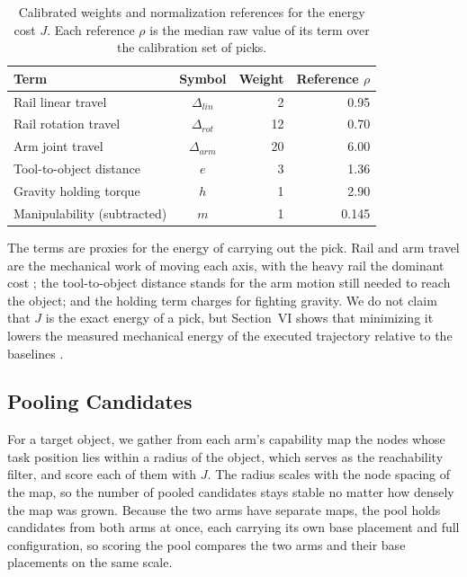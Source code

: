 \documentclass[conference]{IEEEtran}
\begin{document}
\begin{table}[htbp]
\caption{Calibrated weights and normalization references for the energy cost $J$.
Each reference $\rho$ is the median raw value of its term over the calibration set
of picks.}
\begin{center}
\begin{tabular}{|l|c|r|r|}
\hline
\textbf{Term} & \textbf{Symbol} & \textbf{Weight} & \textbf{Reference $\rho$} \\
\hline
Rail linear travel & $\Delta_{lin}$ & 2 & 0.95 \\
\hline
Rail rotation travel & $\Delta_{rot}$ & 12 & 0.70 \\
\hline
Arm joint travel & $\Delta_{arm}$ & 20 & 6.00 \\
\hline
Tool-to-object distance & $e$ & 3 & 1.36 \\
\hline
Gravity holding torque & $h$ & 1 & 2.90 \\
\hline
Manipulability (subtracted) & $m$ & 1 & 0.145 \\
\hline
\end{tabular}
\label{tab:weights}
\end{center}
\end{table}

The terms are proxies for the energy of carrying out the pick. Rail and arm travel
are the mechanical work of moving each axis, with the heavy rail the dominant cost
\cite{MoMaPos2024,BaSeNet2024}; the tool-to-object distance stands for the arm
motion still needed to reach the object; and the holding term charges for fighting
gravity. We do not claim that $J$ is the exact energy of a pick, but Section~VI
shows that minimizing it lowers the measured mechanical energy of the executed
trajectory relative to the baselines \cite{EnergySLR2024}.

\subsection{Pooling Candidates}

For a target object, we gather from each arm's capability map the nodes whose task
position lies within a radius of the object, which serves as the reachability
filter, and score each of them with $J$. The radius scales with the node spacing of
the map, so the number of pooled candidates stays stable no matter how densely the
map was grown. Because the two arms have separate maps, the pool holds candidates
from both arms at once, each carrying its own base placement and full
configuration, so scoring the pool compares the two arms and their base placements
on the same scale.
\end{document}
